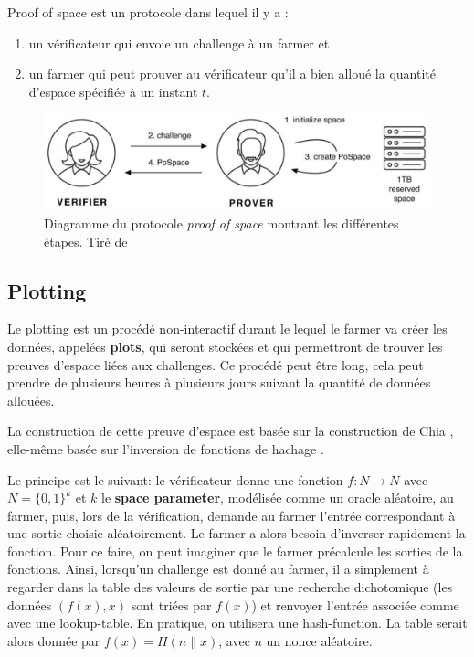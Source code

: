 Proof of space est un protocole dans lequel il y a :

\begin{enumerate}
  \item un vérificateur qui envoie un challenge à un farmer et
  \item un farmer qui peut prouver au vérificateur qu'il a bien alloué la quantité d'espace spécifiée à un instant $t$.
\end{enumerate}

\begin{figure}[H]
  \centering
  \includegraphics[width=\textwidth]{images/pospace.png}
  \caption{Diagramme du protocole \emph{proof of space} montrant les différentes étapes. Tiré de \cite{chia:consensus}}
\end{figure}

\subsection{Plotting}

Le plotting est un procédé non-interactif durant le lequel le farmer va créer les données, appelées \textbf{plots}, qui seront stockées et qui permettront de trouver les preuves d'espace liées aux challenges. Ce procédé peut être long, cela peut prendre de plusieurs heures à plusieurs jours suivant la quantité de données allouées.

La construction de cette preuve d'espace est basée sur la construction de Chia \cite{chia:construction}, elle-même basée sur l'inversion de fonctions de hachage \cite{DBLP:conf/asiacrypt/AbusalahACKPR17}.

Le principe est le suivant: le vérificateur donne une fonction $f: N \rightarrow N$ avec $N = \{0,1\}^k$ et $k$ le \textbf{space parameter}, modélisée comme un oracle aléatoire, au farmer, puis, lors de la vérification, demande au farmer l'entrée correspondant à une sortie choisie aléatoirement. Le farmer a alors besoin d'inverser rapidement la fonction. Pour ce faire, on peut imaginer que le farmer précalcule les sorties de la fonctions. Ainsi, lorsqu'un challenge est donné au farmer, il a simplement à regarder dans la table des valeurs de sortie par une recherche dichotomique (les données $(f(x), x)$ sont triées par $f(x)$) et renvoyer l'entrée associée comme avec une lookup-table. En pratique, on utilisera une \gls{hash-function}. La table serait alors donnée par $f(x) = H(n\|x)$, avec $n$ un nonce aléatoire.

